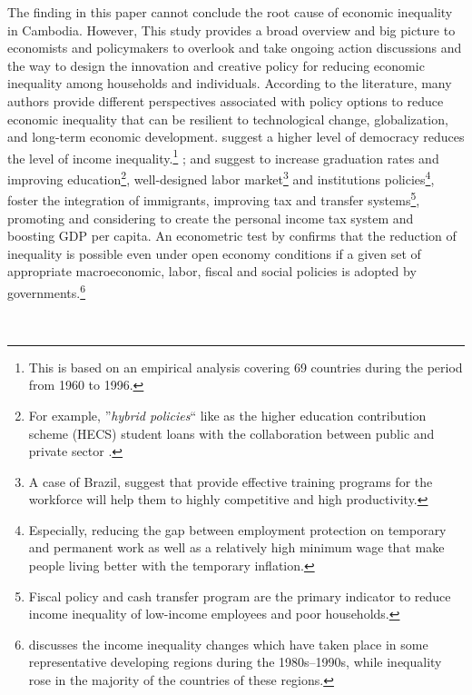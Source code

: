 \documentclass[11pt]{article}
\newcommand*{\TablesPath}{./tables/}
\begin{document}
The finding in this paper cannot conclude the root cause of economic inequality in Cambodia. However, This study provides a broad overview and big picture to economists and policymakers to overlook and take ongoing action discussions and the way to design the innovation and creative policy for reducing economic inequality among households and individuals. According to the literature, many authors provide different perspectives associated with policy options to reduce economic inequality that can be resilient to technological change, globalization, and long-term economic development. \citet{Herran2005} suggest a higher level of democracy reduces the level of income inequality.\footnote{This is based on an empirical analysis covering 69 countries during the period from 1960 to 1996.} \citet{Bastagli2012, Breunig2019}; and \citet{Bastagli2012} suggest to increase graduation rates and improving education\footnote{For example, ''\textit{hybrid policies}`` like as the higher education contribution scheme (HECS) student loans with the collaboration between public and private sector \cite{Breunig2019}.}, well-designed labor market\footnote{A case of Brazil, \citet{Herran2005} suggest that provide effective training programs for the workforce will help them to highly competitive and high productivity.} and institutions policies\footnote{Especially, reducing the gap between employment protection on temporary and permanent work as well as a relatively high minimum wage that make people living better with the temporary inflation.}, foster the integration of immigrants, improving tax and transfer systems\footnote{Fiscal policy and cash transfer program are the primary indicator to reduce income inequality of low-income employees and poor households.}, promoting and considering to create the personal income tax system and boosting GDP per capita. An econometric test by \citet{GIZ2015} confirms that the reduction of inequality is possible even under open economy conditions if a given set of appropriate macroeconomic, labor, fiscal and social policies is adopted by governments.\footnote{\citet{GIZ2015} discusses the income inequality changes which have taken place in some representative developing regions during the 1980s--1990s, while inequality rose in the majority of the countries of these regions.}

\lipsum[3]



\lipsum[4-5] \\

\end{document}
